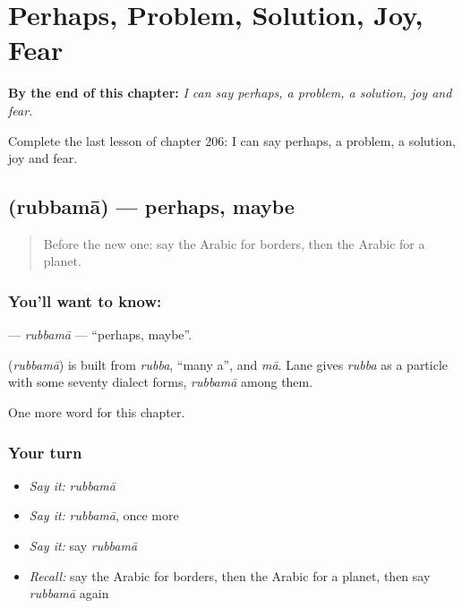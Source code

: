 
\chapter{Perhaps, Problem, Solution, Joy, Fear}
\label{ch:ar-perhaps-problem-solution-joy-fear}

\begin{chapteropening}
\textbf{By the end of this chapter:} \emph{I can say perhaps, a problem, a solution, joy and fear.}

Complete the last lesson of chapter 206: I can say perhaps, a problem, a solution, joy and fear.
\end{chapteropening}

\section[\texorpdfstring{\ar{ربما} (rubbamā)}{ربما (rubbamā)}]{ (rubbamā) — perhaps, maybe}

\label{lesson:AR-C206-rubbama}



\begin{quote}
Before the new one: say the Arabic for borders, then the Arabic for a planet.
\end{quote}

\subsection*{You'll want to know: }
\textbf{} — \emph{rubbamā} — \textquotedblleft{}perhaps, maybe\textquotedblright{}.

\begin{cousinweb}
\textbf{} (\emph{rubbamā}) is built from \emph{rubba}, \textquotedblleft{}many a\textquotedblright{}, and \emph{mā}. Lane gives \emph{rubba} as a particle with some seventy dialect forms, \emph{rubbamā} among them.
\end{cousinweb}

\begin{grammarlens}[title={What you've built}]
One more word for this chapter.
\end{grammarlens}

\subsection*{Your turn}
\begin{itemize}
\raggedright
  \item \emph{Say it:} \emph{rubbamā}
  \item \emph{Say it:} \emph{rubbamā}, once more
  \item \emph{Say it:} say \emph{rubbamā}
  \item \emph{Recall:} say the Arabic for borders, then the Arabic for a planet, then say \emph{rubbamā} again
\end{itemize}

